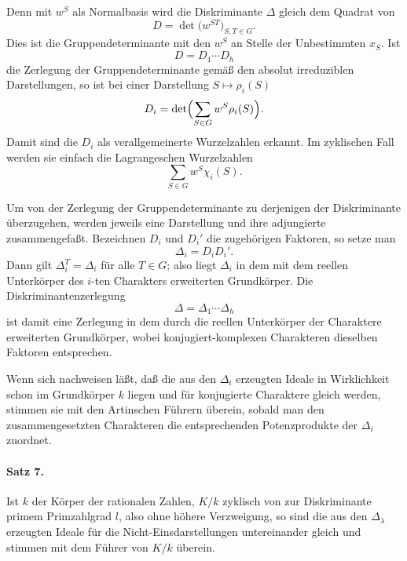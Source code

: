 \documentclass[11pt]{article}
\begin{document}
Denn mit \(w^S\) als Normalbasis wird die Diskriminante \(\Delta\) gleich dem Quadrat von
\[
        D=\det\bigl(w^{ST}\bigr)_{S,T\in G}.
\]
Dies ist die Gruppendeterminante mit den \(w^S\) an Stelle der Unbestimmten \(x_S\). Ist
\[
        D=D_1\cdots D_h
\]
die Zerlegung der Gruppendeterminante gemäß den absolut irreduziblen Darstellungen, so ist bei einer Darstellung \(S\mapsto \rho_i(S)\)
\[
        D_i=\det\Bigl(\sum_{S\in G} w^S\rho_i(S)\Bigr).
\]
Damit sind die \(D_i\) als verallgemeinerte Wurzelzahlen erkannt. Im zyklischen Fall werden sie einfach die Lagrangeschen Wurzelzahlen
\[
        \sum_{S\in G} w^S\chi_i(S).
\]

Um von der Zerlegung der Gruppendeterminante zu derjenigen der Diskriminante überzugehen, werden jeweils eine Darstellung und ihre adjungierte zusammengefaßt. Bezeichnen \(D_i\) und \(D_i'\) die zugehörigen Faktoren, so setze man
\[
        \Delta_i=D_iD_i'.
\]
Dann gilt \(\Delta_i^T=\Delta_i\) für alle \(T\in G\); also liegt \(\Delta_i\) in dem mit dem reellen Unterkörper des \(i\)-ten Charakters erweiterten Grundkörper. Die Diskriminantenzerlegung
\[
        \Delta=\Delta_1\cdots\Delta_h
\]
ist damit eine Zerlegung in dem durch die reellen Unterkörper der Charaktere erweiterten Grundkörper, wobei konjugiert-komplexen Charakteren dieselben Faktoren entsprechen.

Wenn sich nachweisen läßt, daß die aus den \(\Delta_i\) erzeugten Ideale in Wirklichkeit schon im Grundkörper \(k\) liegen und für konjugierte Charaktere gleich werden, stimmen sie mit den Artinschen Führern überein, sobald man den zusammengesetzten Charakteren die entsprechenden Potenzprodukte der \(\Delta_i\) zuordnet.

\paragraph{Satz 7.}
Ist \(k\) der Körper der rationalen Zahlen, \(K/k\) zyklisch von zur Diskriminante primem Primzahlgrad \(l\), also ohne höhere Verzweigung, so sind die aus den \(\Delta_\lambda\) erzeugten Ideale für die Nicht-Einsdarstellungen untereinander gleich und stimmen mit dem Führer von \(K/k\) überein.
\end{document}
